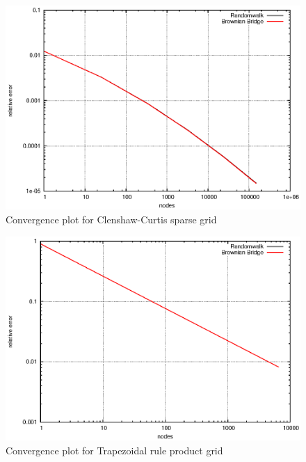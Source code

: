 \documentclass[]{article}
\begin{document}
\begin{figure}[!ht]
\centering
\includegraphics{task16_ccsparse}
\caption{Convergence plot for Clenshaw-Curtis sparse grid}
\label{fig:Task16b}
\end{figure}

\begin{figure}[!ht]
\centering
\includegraphics{task16_trapprod}
\caption{Convergence plot for Trapezoidal rule product grid}
\label{fig:Task16c}
\end{figure}
\end{document}
